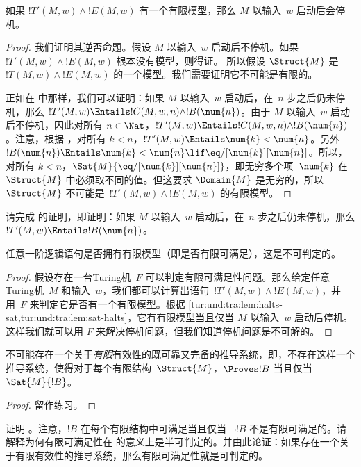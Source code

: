 \documentclass[../../../include/open-logic-section]{subfiles}
\begin{document}
\begin{lem}
  如果 $!T'(M,w) \land !E(M,w)$ 有一个有限模型，那么 $M$ 以输入~$w$ 启动后会停机。
\end{lem}

\begin{proof}
  我们证明其逆否命题。假设 $M$ 以输入~$w$ 启动后不停机。如果 $!T'(M,w) \land !E(M,w)$ 根本没有模型，则得证。
  所以假设 $\Struct{M}$ 是~$!T(M,w) \land !E(M, w)$ 的一个模型。我们需要证明它不可能是有限的。

  正如在  中那样，我们可以证明：如果 $M$ 以输入~$w$ 启动后，在~$n$ 步之后仍未停机，那么 $!T'(M,w)
  \Entails !C(M, w, n) \land !B(\num{n})$。由于 $M$ 以输入~$w$ 启动后不停机，因此对所有 $n \in \Nat$，$!T'(M,w) \Entails !C(M, w, n) \land
  !B(\num{n})$。注意，根据 ，对所有 $k < n$，$!T'(M,w) \Entails \num{k} < \num{n}$。另外 $!B(\num{n}) \Entails \num{k} < \num{n} \lif
  \eq/[\num{k}][\num{n}]$。所以，对所有 $k < n$，$\Sat{M}{\eq/[\num{k}][\num{n}]}$，即无穷多个项~$\num{k}$ 在~$\Struct{M}$ 中必须取不同的值。但这要求 $\Domain{M}$ 是无穷的，所以 $\Struct{M}$ 不可能是~$!T'(M,w) \land !E(M, w)$ 的有限模型。
\end{proof}

\begin{prob}
  请完成  的证明，即证明：如果 $M$ 以输入~$w$ 启动后，在~$n$ 步之后仍未停机，那么 $!T'(M,w) \Entails !B(\num{n})$。
\end{prob}

\begin{thm}[Trakhtenbrot 定理]
  任意一阶逻辑语句是否拥有有限模型（即是否有限可满足），这是不可判定的。
\end{thm}

\begin{proof}
  假设存在一台Turing机~$F$ 可以判定有限可满足性问题。那么给定任意Turing机~$M$ 和输入~$w$，我们都可以计算出语句~$!T'(M,w) \land !E(M,w)$，并用~$F$ 来判定它是否有一个有限模型。根据 \cref{tur:und:tra:lem:halts-sat,tur:und:tra:lem:sat-halts}，它有有限模型当且仅当 $M$ 以输入~$w$ 启动后停机。这样我们就可以用 $F$ 来解决停机问题，但我们知道停机问题是不可解的。
\end{proof}

\begin{cor}%
  不可能存在一个关于\emph{有限}有效性的既可靠又完备的推导系统，即，不存在这样一个推导系统，使得对于每个有限结构~$\Struct{M}$，$\Proves !B$ 当且仅当 $\Sat{M}{!B}$。
\end{cor}

\begin{proof}
  留作练习。
\end{proof}

\begin{prob}
  证明 。注意，$!B$ 在每个有限结构中可满足当且仅当 $\lnot !B$ 不是有限可满足的。请解释为何有限可满足性在  的意义上是半可判定的。并由此论证：如果存在一个关于有限有效性的推导系统，那么有限可满足性就是可判定的。
\end{prob}
\end{document}
